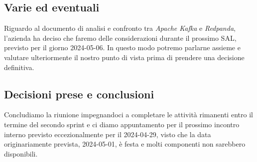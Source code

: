 \documentclass[italian,12pt]{article}
\begin{document}
\subsection{Varie ed eventuali}
Riguardo al documento di analisi e confronto tra \textit{Apache Kafka} e \textit{Redpanda}, l'azienda ha deciso che faremo delle considerazioni durante il prossimo SAL, previsto per il giorno 2024-05-06. In questo modo potremo parlarne assieme e valutare ulteriormente il nostro punto di vista prima di prendere una decisione definitiva.

\subsection{Decisioni prese e conclusioni}
Concludiamo la riunione impegnandoci a completare le attività rimanenti entro il termine del secondo sprint e ci diamo appuntamento per il prossimo incontro interno previsto eccezionalmente per il 2024-04-29, visto che la data originariamente prevista, 2024-05-01, è festa e molti componenti non sarebbero disponibili.
\end{document}
